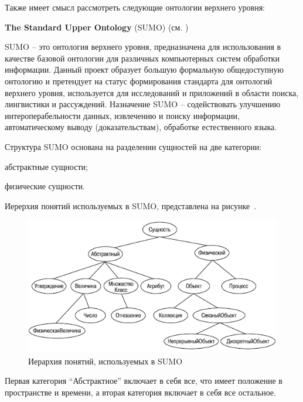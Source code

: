 Также имеет смысл рассмотреть следующие онтологии верхнего уровня:
\begin{textitemize}
	\item{\textbf{The Standard Upper Ontology} (SUMO) (см. )}
\end{textitemize}

SUMO -- это онтология верхнего уровня, предназначена для использования в качестве базовой онтологии для различных компьютерных систем обработки информации. Данный проект образует большую формальную общедоступную онтологию и претендует на статус формирования стандарта для онтологий верхнего уровня, используется для исследований и приложений в области поиска, лингвистики и рассуждений. Назначение SUMO -- содействовать улучшению интероперабельности данных, извлечению и поиску информации, автоматическому выводу (доказательствам), обработке естественного языка.

Структура SUMO основана на разделении сущностей на две категории:
\begin{textitemize}
	\item абстрактные сущности;
	\item физические сущности.
\end{textitemize}

Иерерхия понятий используемых в SUMO, представлена на рисунке~\textit{}.

\begin{figure}[H]
	\includegraphics[scale=0.8]{author/part2/figures/chapter_kb/sumo.png}
	\caption{Иерархия понятий, используемых в SUMO}
	\label{fig:bfo}
\end{figure}

Первая категория ``Абстрактное'' включает в себя все, что имеет положение в пространстве и времени, а вторая категория включает в себя все остальное.


